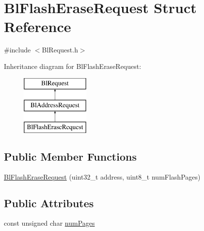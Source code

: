 \hypertarget{struct_bl_flash_erase_request}{\section{Bl\-Flash\-Erase\-Request Struct Reference}
\label{struct_bl_flash_erase_request}
}


{\ttfamily \#include $<$Bl\-Request.\-h$>$}

Inheritance diagram for Bl\-Flash\-Erase\-Request\-:\begin{figure}[H]
\begin{center}
\leavevmode
\includegraphics[height=3.000000cm]{struct_bl_flash_erase_request}
\end{center}
\end{figure}
\subsection*{Public Member Functions}
\begin{DoxyCompactItemize}
\item 
\hyperlink{struct_bl_flash_erase_request_aea945f360bd7e53e625a9235071599d8}{Bl\-Flash\-Erase\-Request} (uint32\-\_\-t address, uint8\-\_\-t num\-Flash\-Pages)
\end{DoxyCompactItemize}
\subsection*{Public Attributes}
\begin{DoxyCompactItemize}
\item 
const unsigned char \hyperlink{struct_bl_flash_erase_request_aa7440aea6fb9fa10b4685195b8d6f433}{num\-Pages}
\end{DoxyCompactItemize}


